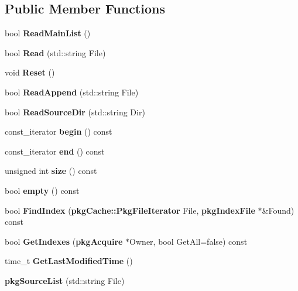 \subsection*{\-Public \-Member \-Functions}
\begin{DoxyCompactItemize}
\item 
bool {\bfseries \-Read\-Main\-List} ()\label{classpkgSourceList_a2cc9bcdef680269456381b9f0dad7bdd}

\item 
bool {\bfseries \-Read} (std\-::string \-File)\label{classpkgSourceList_a71bd2521e8db5d1db37b6d52cc954a72}

\item 
void {\bfseries \-Reset} ()\label{classpkgSourceList_a372de693ad40b3f42839c8ec6ac845f4}

\item 
bool {\bfseries \-Read\-Append} (std\-::string \-File)\label{classpkgSourceList_ad28c9c105513d7311603036585566e34}

\item 
bool {\bfseries \-Read\-Source\-Dir} (std\-::string \-Dir)\label{classpkgSourceList_a5598e80ee81035f4a61ec5788b40cdcc}

\item 
const\-\_\-iterator {\bfseries begin} () const \label{classpkgSourceList_aa4b02d4f1a8500fb07a551069060709f}

\item 
const\-\_\-iterator {\bfseries end} () const \label{classpkgSourceList_a350132543d80a1c1e5be844e6d2878ea}

\item 
unsigned int {\bfseries size} () const \label{classpkgSourceList_a90ca964ebcc1b02bbcde225edd49e812}

\item 
bool {\bfseries empty} () const \label{classpkgSourceList_ac6e61de369e994009e36f344f99c15ad}

\item 
bool {\bfseries \-Find\-Index} ({\bf pkg\-Cache\-::\-Pkg\-File\-Iterator} \-File, {\bf pkg\-Index\-File} $\ast$\&\-Found) const \label{classpkgSourceList_a5a001ca1f36543c5906681574a0b654d}

\item 
bool {\bfseries \-Get\-Indexes} ({\bf pkg\-Acquire} $\ast$\-Owner, bool \-Get\-All=false) const \label{classpkgSourceList_ac0ef285f2bfc79ceb887880bd039e351}

\item 
time\-\_\-t {\bfseries \-Get\-Last\-Modified\-Time} ()\label{classpkgSourceList_a80cc8a09eade3bcea13ecc0e2412a196}

\item 
{\bfseries pkg\-Source\-List} (std\-::string \-File)\label{classpkgSourceList_ad69ff607b359389e049704280c6a2e40}

\end{DoxyCompactItemize}
